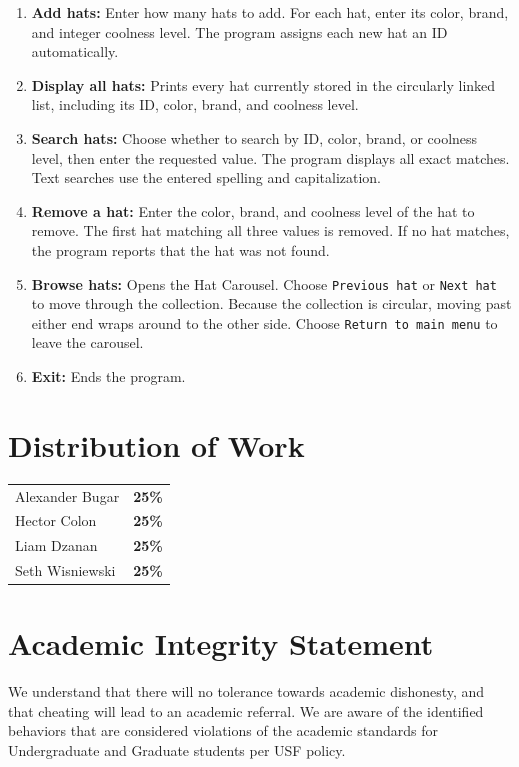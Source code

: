 \documentclass[11pt,letterpaper]{article}
\begin{document}
\begin{enumerate}
    \item \textbf{Add hats:} Enter how many hats to add. For each hat, enter its color, brand, and integer coolness level. The program assigns each new hat an ID automatically.

    \item \textbf{Display all hats:} Prints every hat currently stored in the circularly linked list, including its ID, color, brand, and coolness level.

    \item \textbf{Search hats:} Choose whether to search by ID, color, brand, or coolness level, then enter the requested value. The program displays all exact matches. Text searches use the entered spelling and capitalization.

    \item \textbf{Remove a hat:} Enter the color, brand, and coolness level of the hat to remove. The first hat matching all three values is removed. If no hat matches, the program reports that the hat was not found.

    \item \textbf{Browse hats:} Opens the Hat Carousel. Choose \texttt{Previous hat} or \texttt{Next hat} to move through the collection. Because the collection is circular, moving past either end wraps around to the other side. Choose \texttt{Return to main menu} to leave the carousel.

    \item \textbf{Exit:} Ends the program.
\end{enumerate}

\section*{Distribution of Work}
\begin{tabular}{@{}ll@{}}
    Alexander Bugar & \textbf{25\%} \\
    Hector Colon & \textbf{25\%} \\
    Liam Dzanan & \textbf{25\%} \\
    Seth Wisniewski & \textbf{25\%}
\end{tabular}

\section*{Academic Integrity Statement}
We understand that there will no tolerance towards academic dishonesty, and that cheating will lead to an academic referral. We are aware of the identified behaviors that are considered violations of the academic standards for Undergraduate and Graduate students per USF policy.
\end{document}
